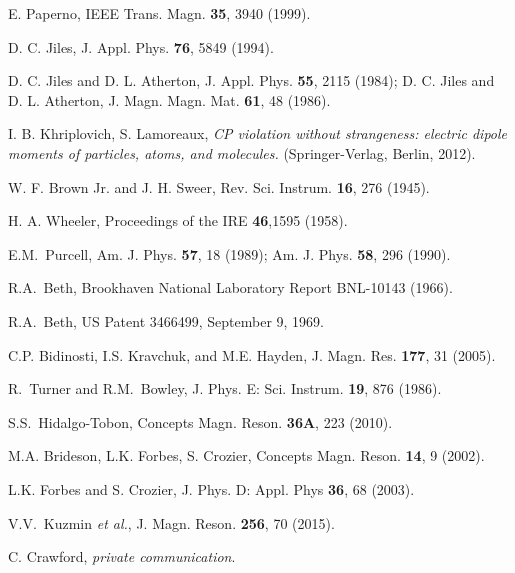 \documentclass[review]{elsarticle}
\begin{document}
\begin{thebibliography}{00}
 E. Paperno, IEEE Trans. Magn. {\bf
  35}, 3940 (1999).

 D. C. Jiles, J. Appl. Phys. {\bf 76}, 5849 (1994).

 D. C. Jiles and D. L. Atherton,
  J. Appl. Phys. {\bf 55}, 2115 (1984); D. C. Jiles and D. L. Atherton,
  J. Magn. Magn. Mat. {\bf 61}, 48 (1986).



 I. B. Khriplovich,
  S. Lamoreaux, {\it CP violation without strangeness: electric dipole
    moments of particles, atoms, and molecules.} (Springer-Verlag,
  Berlin, 2012).



 W. F. Brown Jr. and J. H. Sweer, Rev. Sci. Instrum. {\bf 16},  276 (1945).

 H. A. Wheeler, Proceedings of the IRE {\bf 46},1595 (1958).  %

E.M.\ Purcell, %
Am. J. Phys. \textbf{57}, 18 (1989); Am. J. Phys. \textbf{58}, 296 (1990). %




 R.A.\  Beth, Brookhaven National Laboratory Report %
BNL-10143 (1966). %

 R.A.\  Beth, %
US Patent 3466499, September 9, 1969.


 C.P. Bidinosti, I.S. Kravchuk, and
  M.E. Hayden, J. Magn. Res. {\bf 177}, 31 (2005).
  

 R.\ Turner and R.M.\ Bowley, %
J. Phys. E: Sci. Instrum. \textbf{19}, 876 (1986). %

 S.S.\ Hidalgo-Tobon, %
Concepts Magn. Reson. \textbf{36A}, 223 (2010).  %

 M.A. Brideson, L.K. Forbes, S. Crozier, Concepts Magn. Reson. {\bf 14}, 9 (2002).

 L.K. Forbes and S. Crozier, J. Phys. D: Appl. Phys {\bf 36}, 68 (2003).

 V.V.\ Kuzmin  {\it et al.}, J. Magn. Reson. {\bf 256}, 70 (2015).

 C. Crawford, \textit{private communication}.





\end{thebibliography}
\end{document}

